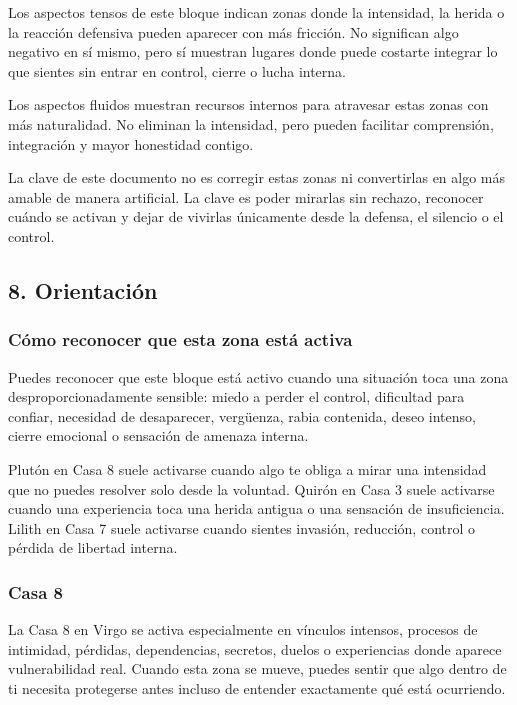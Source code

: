 \documentclass[11pt,a4paper]{article}
\begin{document}
Los aspectos tensos de este bloque indican zonas donde la intensidad, la herida o la reacción defensiva pueden aparecer con más fricción. No significan algo negativo en sí mismo, pero sí muestran lugares donde puede costarte integrar lo que sientes sin entrar en control, cierre o lucha interna.

Los aspectos fluidos muestran recursos internos para atravesar estas zonas con más naturalidad. No eliminan la intensidad, pero pueden facilitar comprensión, integración y mayor honestidad contigo.

La clave de este documento no es corregir estas zonas ni convertirlas en algo más amable de manera artificial. La clave es poder mirarlas sin rechazo, reconocer cuándo se activan y dejar de vivirlas únicamente desde la defensa, el silencio o el control.

\vspace{0.4cm}

\subsection{8. Orientación}

\subsubsection*{Cómo reconocer que esta zona está activa}
Puedes reconocer que este bloque está activo cuando una situación toca una zona desproporcionadamente sensible: miedo a perder el control, dificultad para confiar, necesidad de desaparecer, vergüenza, rabia contenida, deseo intenso, cierre emocional o sensación de amenaza interna.

Plutón en Casa 8 suele activarse cuando algo te obliga a mirar una intensidad que no puedes resolver solo desde la voluntad. Quirón en Casa 3 suele activarse cuando una experiencia toca una herida antigua o una sensación de insuficiencia. Lilith en Casa 7 suele activarse cuando sientes invasión, reducción, control o pérdida de libertad interna.

\subsubsection*{Casa 8}
La Casa 8 en Virgo se activa especialmente en vínculos intensos, procesos de intimidad, pérdidas, dependencias, secretos, duelos o experiencias donde aparece vulnerabilidad real. Cuando esta zona se mueve, puedes sentir que algo dentro de ti necesita protegerse antes incluso de entender exactamente qué está ocurriendo.
\end{document}
